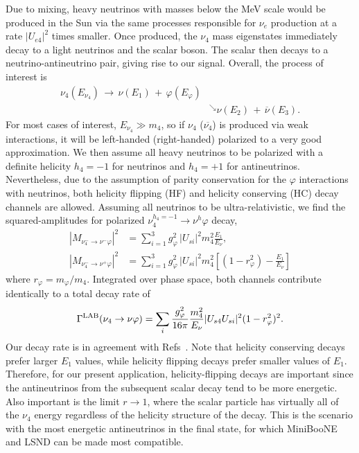 \documentclass[
reprint,
superscriptaddress,
showpacs,
preprintnumbers,
nofootinbib,
nobibnotes,
amsmath,
amssymb, 
aps,
prd,
floatfix
]{revtex4-1}
\renewcommand{\phi}{\varphi}
\begin{document}
Due to mixing, heavy neutrinos with masses below the MeV scale would be produced in the Sun via the same processes responsible for $\nu_e$ production at a rate $|U_{e4}|^2$ times smaller. Once produced, the $\nu_4$ mass eigenstates immediately decay to a light neutrinos and the scalar boson. The scalar then decays to a neutrino-antineutrino pair, giving rise to our signal. Overall, the process of interest is
\begin{align}
    \nu_4 (E_{\nu_4}) \,\to\, \nu(E_1) \,+\, \phi(E_\phi)&
    \\\nonumber
    &^\searrow \nu (E_2) \,+\,  \overline{\nu} (E_3).
\end{align}
%
For most cases of interest, $E_{\nu_4} \gg m_4$, so if $\nu_4$ ($\overline{\nu_4}$) is produced via weak interactions, it will be left-handed (right-handed) polarized to a very good approximation. We then assume all heavy neutrinos to be polarized with a definite helicity $h_4=-1$ for neutrinos and $h_4=+1$ for antineutrinos. Nevertheless, due to the assumption of parity conservation for the $\phi$ interactions with neutrinos, both helicity flipping (HF) and helicity conserving (HC) decay channels are allowed. Assuming all neutrinos to be ultra-relativistic, we find the squared-amplitudes for polarized $\nu_4^{h_4=-1} \to \nu^{h} \phi$ decay,
%
\begin{align}
\left|M_{\nu_4^-\to \nu^-\phi}\right|^2 &= \sum_{i=1}^3 g_\phi^2 \,|U_{si}|^2  m_4^2 \frac{E_1}{E_\nu},
\\
\left|M_{\nu_4^-\to \nu^+\phi}\right|^2 &= \sum_{i=1}^3 g_\phi^2 \,|U_{si}|^2 m_4^2  \left[(1-r_\phi^2)-\frac{E_1}{E_\nu}\right]
\end{align}
where $r_\phi = m_\phi/m_4$. Integrated over phase space, both channels contribute identically to a total decay rate of
\begin{equation}\label{eq:nu4rate}
    \Gamma^{\rm LAB} (\nu_4 \to \nu \phi) = \sum_{i} \frac{g_\phi^2}{16\pi} \frac{m_4^2}{E_\nu} |U_{s4}U_{s i}|^2 (1-r_\phi^2)^2.
\end{equation}
Our decay rate is in agreement with Refs~\cite{Kim:1990km,Dentler:2019dhz}. Note that helicity conserving decays prefer larger $E_1$ values, while helicity flipping decays prefer smaller values of $E_1$. Therefore, for our present application, helicity-flipping decays are important since the antineutrinos from the subsequent scalar decay tend to be more energetic. Also important is the limit $r\to1$, where the scalar particle has virtually all of the $\nu_4$ energy regardless of the helicity structure of the decay. This is the scenario with the most energetic antineutrinos in the final state, for which MiniBooNE and LSND can be made most compatible.
\end{document}

